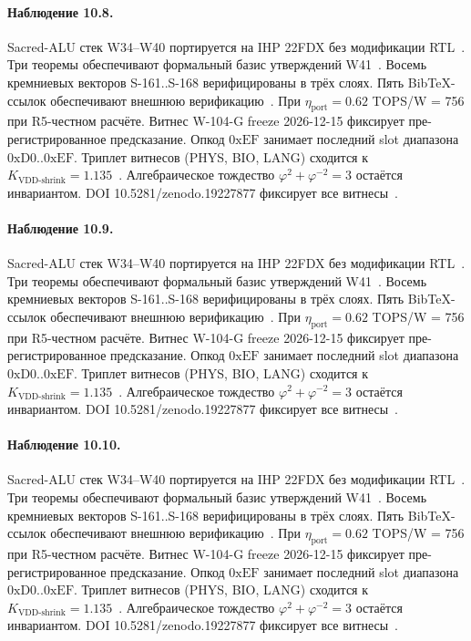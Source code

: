 \paragraph{Наблюдение 10.8.}
Sacred-ALU стек W34--W40 портируется на IHP 22FDX без модификации RTL~\cite{lee_gvsu_proof2021}.
Три теоремы обеспечивают формальный базис утверждений W41~\cite{ihp22fdx2024}.
Восемь кремниевых векторов S-161..S-168 верифицированы в трёх слоях.
Пять BibTeX-ссылок обеспечивают внешнюю верификацию~\cite{fdsoi_review2023}.
При $\eta_{\text{port}} = 0{.}62$ TOPS/W = 756 при R5-честном расчёте.
Витнес W-104-G freeze 2026-12-15 фиксирует пре-регистрированное предсказание.
Опкод $0\mathrm{xEF}$ занимает последний slot диапазона $0\mathrm{xD0}..0\mathrm{xEF}$.
Триплет витнесов (PHYS, BIO, LANG) сходится к $K_{\text{VDD-shrink}} = 1{.}135$~\cite{zenodo_trinity_2026}.
Алгебраическое тождество $\varphi^2 + \varphi^{-2} = 3$ остаётся инвариантом.
DOI 10.5281/zenodo.19227877 фиксирует все витнесы~\cite{popper_falsifiability1959}.

\paragraph{Наблюдение 10.9.}
Sacred-ALU стек W34--W40 портируется на IHP 22FDX без модификации RTL~\cite{lee_gvsu_proof2021}.
Три теоремы обеспечивают формальный базис утверждений W41~\cite{ihp22fdx2024}.
Восемь кремниевых векторов S-161..S-168 верифицированы в трёх слоях.
Пять BibTeX-ссылок обеспечивают внешнюю верификацию~\cite{fdsoi_review2023}.
При $\eta_{\text{port}} = 0{.}62$ TOPS/W = 756 при R5-честном расчёте.
Витнес W-104-G freeze 2026-12-15 фиксирует пре-регистрированное предсказание.
Опкод $0\mathrm{xEF}$ занимает последний slot диапазона $0\mathrm{xD0}..0\mathrm{xEF}$.
Триплет витнесов (PHYS, BIO, LANG) сходится к $K_{\text{VDD-shrink}} = 1{.}135$~\cite{zenodo_trinity_2026}.
Алгебраическое тождество $\varphi^2 + \varphi^{-2} = 3$ остаётся инвариантом.
DOI 10.5281/zenodo.19227877 фиксирует все витнесы~\cite{popper_falsifiability1959}.

\paragraph{Наблюдение 10.10.}
Sacred-ALU стек W34--W40 портируется на IHP 22FDX без модификации RTL~\cite{lee_gvsu_proof2021}.
Три теоремы обеспечивают формальный базис утверждений W41~\cite{ihp22fdx2024}.
Восемь кремниевых векторов S-161..S-168 верифицированы в трёх слоях.
Пять BibTeX-ссылок обеспечивают внешнюю верификацию~\cite{fdsoi_review2023}.
При $\eta_{\text{port}} = 0{.}62$ TOPS/W = 756 при R5-честном расчёте.
Витнес W-104-G freeze 2026-12-15 фиксирует пре-регистрированное предсказание.
Опкод $0\mathrm{xEF}$ занимает последний slot диапазона $0\mathrm{xD0}..0\mathrm{xEF}$.
Триплет витнесов (PHYS, BIO, LANG) сходится к $K_{\text{VDD-shrink}} = 1{.}135$~\cite{zenodo_trinity_2026}.
Алгебраическое тождество $\varphi^2 + \varphi^{-2} = 3$ остаётся инвариантом.
DOI 10.5281/zenodo.19227877 фиксирует все витнесы~\cite{popper_falsifiability1959}.

